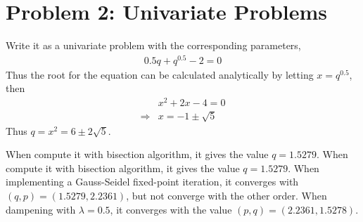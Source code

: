 \section*{Problem 2: Univariate Problems}
Write it as a univariate problem with the corresponding parameters,
\begin{align*}
0.5q+q^{0.5}-2=0
\end{align*}
Thus the root for the equation can be calculated analytically by letting $x=q^{0.5}$, then 
\begin{align*}
&x^{2}+2x-4=0\\
\Rightarrow& x=-1\pm \sqrt{5}
\end{align*}
Thus $q=x^{2}=6\pm2\sqrt{5}$.

When compute it with bisection algorithm, it gives the value $q=1.5279$.
When compute it with bisection algorithm, it gives the value $q=1.5279$. 
When implementing a Gauss-Seidel fixed-point iteration, it converges with $(q,p) = (1.5279,2.2361)$, but not converge with the other order. When dampening with $\lambda=0.5$, it converges with the value $(p,q) = (2.2361,1.5278)$.